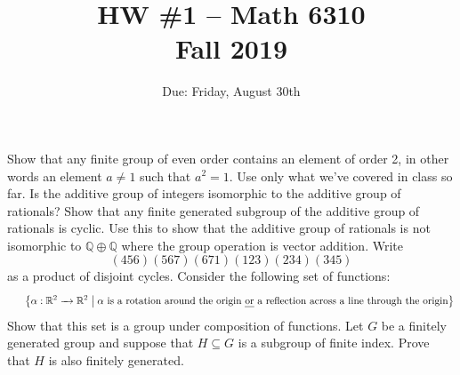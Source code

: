 \documentclass[11pt]{amsart}
\theoremstyle{theorem}
\renewcommand{\to}[1][]{\xrightarrow{\ #1\ }}
\newcommand{\bR}{{\mathbb{R}}}
\newcommand{\bQ}{\mathbb{Q}}
\begin{document}
\title{HW \#1 -- Math 6310\\Fall 2019}
\author{Due: Friday, August 30th}
\maketitle


 Show that any finite group of even order contains an element of order 2, in other words an element $a \neq 1$ such that $a^2 = 1$.  Use only what we've covered in class so far.
\newpage
{}  Is the additive group of integers isomorphic to the additive group of rationals?
\newpage
{}  Show that any finite generated subgroup of the additive group of rationals is cyclic.  Use this to show that the additive group of rationals is not isomorphic to $\bQ \oplus \bQ$ where the group operation is vector addition.
\newpage
{} Write
\[
(456)(567)(671)(123)(234)(345)
\]
as a product of disjoint cycles.
\newpage
{} Consider the following set of functions:
\[
\;\;\;\;\;\;\big\{ \alpha : \bR^2 \to \bR^2 \;\big|\; \alpha \text{ is a rotation around the origin \emph{or} a reflection across a line through the origin} \big\}
\]
Show that this set is a group under composition of functions.
\newpage
{}  Let $G$ be a finitely generated group and suppose that $H \subseteq G$ is a subgroup of finite index.  Prove that $H$ is also finitely generated.
\end{document}
